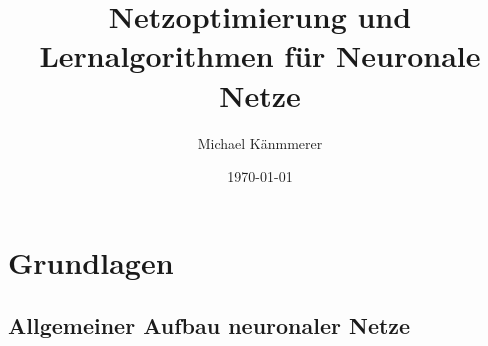 \documentclass[12pt,titlepage]{beamer}
\begin{document}
	\title{Netzoptimierung und Lernalgorithmen für Neuronale Netze}
	\author{Michael Känmmerer}
	\date{\today}
	\institute{}
	\begin{frame}
		\maketitle
	\end{frame}
	\section{Grundlagen}
	\subsection{Allgemeiner Aufbau neuronaler Netze}
		
\end{document}
